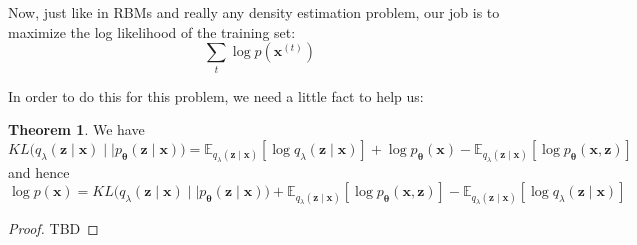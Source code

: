 \documentclass{article}
\theoremstyle{definition}
\newtheorem{theorem}{Theorem}[section]
\theoremstyle{remark}
\theoremstyle{definition}
\begin{document}
Now, just like in RBMs and really any density estimation problem, our job is to maximize the log likelihood of the training set: 
\[\sum_{t} \log p(\mathbf{x}^{(t)})\]

In order to do this for this problem, we need a little fact to help us: 

\begin{theorem}
We have 
\[KL \big( q_\lambda (\mathbf{z} \mid \mathbf{x}) \mid\mid p_{\boldsymbol{\theta}} (\mathbf{z} \mid \mathbf{x}) \big) = \mathbb{E}_{q_\lambda(\mathbf{z} \mid \mathbf{x})} [ \log q_{\lambda} (\mathbf{z} \mid \mathbf{x})] + \log p_{\boldsymbol{\theta}} (\mathbf{x}) - \mathbb{E}_{q_{\lambda} (\mathbf{z} \mid \mathbf{x})} [\log p_{\boldsymbol{\theta}} (\mathbf{x}, \mathbf{z})] \]
and hence 
\[\log p(\mathbf{x}) = KL \big( q_\lambda (\mathbf{z} \mid \mathbf{x}) \mid\mid p_{\boldsymbol{\theta}} (\mathbf{z} \mid \mathbf{x}) \big) + \mathbb{E}_{q_{\lambda} (\mathbf{z} \mid \mathbf{x})} [\log p_{\boldsymbol{\theta}} (\mathbf{x}, \mathbf{z})] - \mathbb{E}_{q_\lambda(\mathbf{z} \mid \mathbf{x})} [ \log q_{\lambda} (\mathbf{z} \mid \mathbf{x})]  \]
\end{theorem}
\begin{proof}
TBD 
\end{proof}
\end{document}
